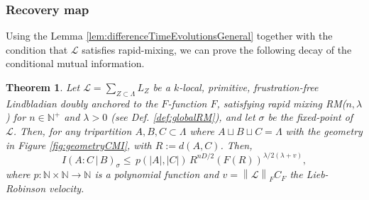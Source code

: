\documentclass[11pt]{article}
\numberwithin{equation}{section}
\numberwithin{figure}{section}
\numberwithin{table}{section}
\theoremstyle{definition}
\theoremstyle{plain}
\newtheorem{thm}{Theorem}[section]
\theoremstyle{remark}
\newcommand{\Li}{\mathcal{L}}
\newcommand{\La}{\Lambda}
\newcommand{\normm}[2]{\left\lVert#1\right\rVert_{#2}}
\newcommand{\abs}[1]{\left \vert#1\right\vert}
\begin{document}
\subsubsection{Recovery map}

Using the Lemma \ref{lem:differenceTimeEvolutionsGeneral} together with the condition that $\Li$ satisfies rapid-mixing, we can prove the following decay of the conditional mutual information. 

\medskip
\begin{thm}\label{thm:decayCMIgeneralLindbladian}
    Let $\Li=\sum_{Z\subset \La}L_Z$ be a $k$-local, primitive, frustration-free Lindbladian doubly anchored to the $F$-function $F$, satisfying rapid mixing RM($n,\lambda$) for $n\in\mathbb{N}^+$ and $\lambda >0$ (see Def. \ref{def:globalRM}), and let $\sigma$ be the fixed-point of $\Li$. Then, for any tripartition $A,B,C\subset\La$ where $A\sqcup B\sqcup C=\La$ with the geometry in Figure \ref{fig:geometryCMI}, with $R:=d(A,C)$. Then,
    \begin{equation}
            I(A : C \,|\, B)_\sigma \le \, p(\abs{A},\abs{C})\, R^{nD/2} (F(R))^{\lambda/2(\lambda+v)} ,
    \end{equation}
    where $p:\mathbb{N}\times\mathbb{N}\to \mathbb{N}$ is a polynomial function and $v=\normm{\Li}{F}C_F$ the Lieb-Robinson velocity. 

\end{thm}
\end{document}
